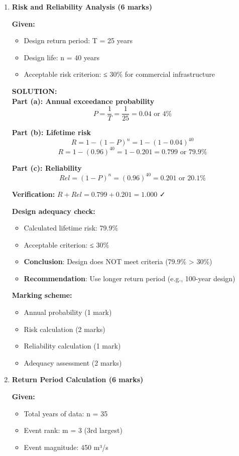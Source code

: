 \documentclass[11pt,a4paper]{article}
\newenvironment{solutionbox}
    {\color{solution}\begin{framed}\textbf{SOLUTION:}\\\vspace{0.2cm}}
    {\end{framed}}
\begin{document}
\begin{enumerate}
\item \textbf{Risk and Reliability Analysis (6 marks)}

\textbf{Given:}
\begin{itemize}[nosep]
    \item Design return period: T = 25 years
    \item Design life: n = 40 years
    \item Acceptable risk criterion: ≤ 30\% for commercial infrastructure
\end{itemize}

\begin{solutionbox}
\textbf{Part (a): Annual exceedance probability}
$$P = \frac{1}{T} = \frac{1}{25} = 0.04 \text{ or } 4\%$$

\textbf{Part (b): Lifetime risk}
$$R = 1-(1-P)^n = 1-(1-0.04)^{40}$$
$$R = 1-(0.96)^{40} = 1-0.201 = 0.799 \text{ or } 79.9\%$$

\textbf{Part (c): Reliability}
$$Rel = (1-P)^n = (0.96)^{40} = 0.201 \text{ or } 20.1\%$$

\textbf{Verification:} $R + Rel = 0.799 + 0.201 = 1.000$ ✓

\textbf{Design adequacy check:}
\begin{itemize}[nosep]
    \item Calculated lifetime risk: 79.9\%
    \item Acceptable criterion: ≤ 30\%
    \item \textbf{Conclusion}: Design does NOT meet criteria (79.9\% > 30\%)
    \item \textbf{Recommendation}: Use longer return period (e.g., 100-year design)
\end{itemize}

\textbf{Marking scheme:}
\begin{itemize}[nosep]
    \item Annual probability (1 mark)
    \item Risk calculation (2 marks)
    \item Reliability calculation (1 mark)
    \item Adequacy assessment (2 marks)
\end{itemize}
\end{solutionbox}

\item \textbf{Return Period Calculation (6 marks)}

\textbf{Given:}
\begin{itemize}[nosep]
    \item Total years of data: n = 35
    \item Event rank: m = 3 (3rd largest)
    \item Event magnitude: 450 m³/s
\end{itemize}


\end{enumerate}
\end{document}
